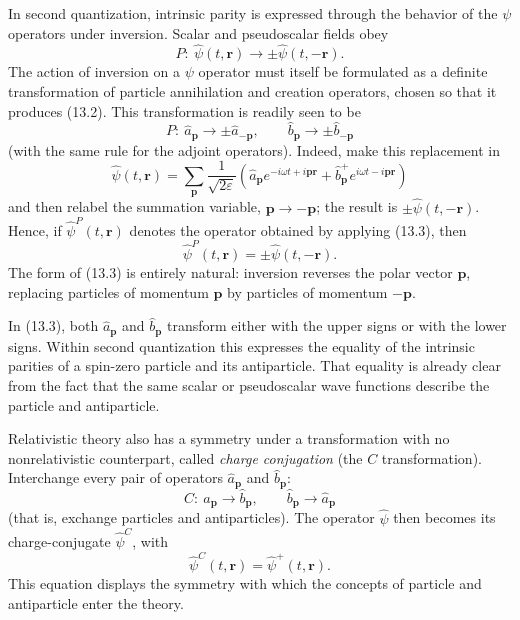 In second quantization, intrinsic parity is expressed through the behavior of the $\psi$ operators under inversion. Scalar and pseudoscalar fields obey
\begin{equation}
P:\ \widehat\psi(t,\mathbf{r})\to\pm\widehat\psi(t,-\mathbf{r}).
\tag{13.2}
\end{equation}
The action of inversion on a $\psi$ operator must itself be formulated as a definite transformation of particle annihilation and creation operators, chosen so that it produces (13.2). This transformation is readily seen to be
\begin{equation}
P:\ \widehat a_{\mathbf{p}}\to\pm\widehat a_{-\mathbf{p}},
\qquad
\widehat b_{\mathbf{p}}\to\pm\widehat b_{-\mathbf{p}}
\tag{13.3}
\end{equation}
(with the same rule for the adjoint operators). Indeed, make this replacement in
\begin{equation}
\widehat\psi(t,\mathbf{r})
=\sum_{\mathbf{p}}\frac{1}{\sqrt{2\varepsilon}}
\left(\widehat a_{\mathbf{p}}e^{-i\omega t+i\mathbf{p}\mathbf{r}}
+\widehat b^+_{\mathbf{p}}e^{i\omega t-i\mathbf{p}\mathbf{r}}\right)
\tag{13.4}
\end{equation}
and then relabel the summation variable, $\mathbf{p}\to-\mathbf{p}$; the result is $\pm\widehat\psi(t,-\mathbf{r})$. Hence, if $\widehat\psi^P(t,\mathbf{r})$ denotes the operator obtained by applying (13.3), then
\begin{equation}
\widehat\psi^P(t,\mathbf{r})=\pm\widehat\psi(t,-\mathbf{r}).
\tag{13.5}
\end{equation}
The form of (13.3) is entirely natural: inversion reverses the polar vector $\mathbf{p}$, replacing particles of momentum $\mathbf{p}$ by particles of momentum $-\mathbf{p}$.

In (13.3), both $\widehat a_{\mathbf{p}}$ and $\widehat b_{\mathbf{p}}$ transform either with the upper signs or with the lower signs. Within second quantization this expresses the equality of the intrinsic parities of a spin-zero particle and its antiparticle. That equality is already clear from the fact that the same scalar or pseudoscalar wave functions describe the particle and antiparticle.

Relativistic theory also has a symmetry under a transformation with no nonrelativistic counterpart, called \emph{charge conjugation} (the $C$ transformation). Interchange every pair of operators $\widehat a_{\mathbf{p}}$ and $\widehat b_{\mathbf{p}}$:
\begin{equation}
C:\ \widehat a_{\mathbf{p}}\to\widehat b_{\mathbf{p}},
\qquad
\widehat b_{\mathbf{p}}\to\widehat a_{\mathbf{p}}
\tag{13.6}
\end{equation}
(that is, exchange particles and antiparticles). The operator $\widehat\psi$ then becomes its charge-conjugate $\widehat\psi^C$, with
\begin{equation}
\widehat\psi^C(t,\mathbf{r})=\widehat\psi^+(t,\mathbf{r}).
\tag{13.7}
\end{equation}
This equation displays the symmetry with which the concepts of particle and antiparticle enter the theory.


